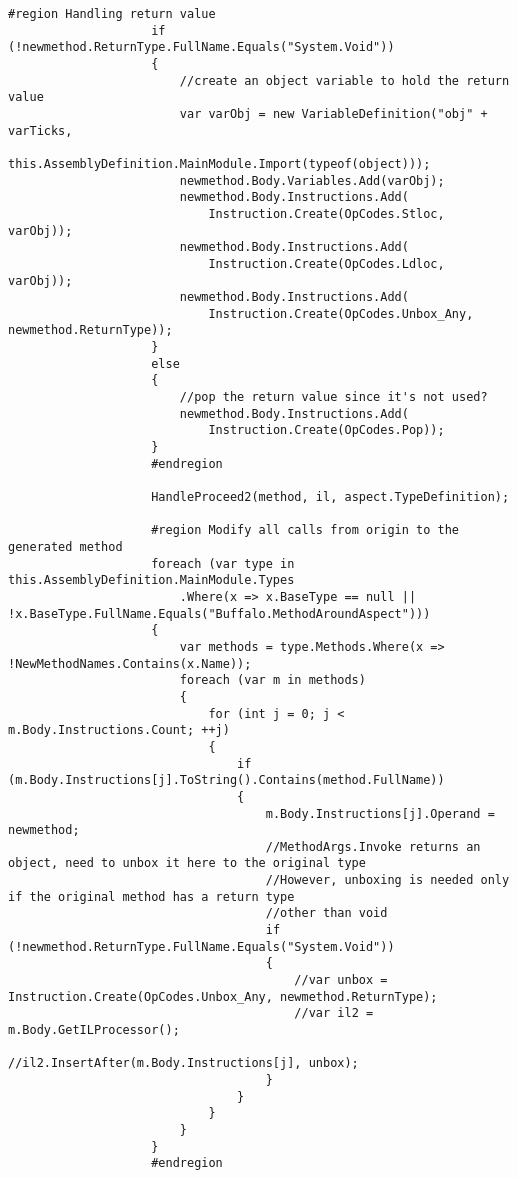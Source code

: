 \begin{lstlisting}[caption={../buffalo/Injectors/MethodAroundInjector.cs}, label=../buffalo/Injectors/MethodAroundInjector.cs, frame=tb, basicstyle=\scriptsize]
                    #region Handling return value
                    if (!newmethod.ReturnType.FullName.Equals("System.Void"))
                    {
                        //create an object variable to hold the return value
                        var varObj = new VariableDefinition("obj" + varTicks,
                            this.AssemblyDefinition.MainModule.Import(typeof(object)));
                        newmethod.Body.Variables.Add(varObj);
                        newmethod.Body.Instructions.Add(
                            Instruction.Create(OpCodes.Stloc, varObj));
                        newmethod.Body.Instructions.Add(
                            Instruction.Create(OpCodes.Ldloc, varObj));
                        newmethod.Body.Instructions.Add(
                            Instruction.Create(OpCodes.Unbox_Any, newmethod.ReturnType));
                    }
                    else
                    {
                        //pop the return value since it's not used?
                        newmethod.Body.Instructions.Add(
                            Instruction.Create(OpCodes.Pop));
                    }
                    #endregion

                    HandleProceed2(method, il, aspect.TypeDefinition);

                    #region Modify all calls from origin to the generated method
                    foreach (var type in this.AssemblyDefinition.MainModule.Types
                        .Where(x => x.BaseType == null || !x.BaseType.FullName.Equals("Buffalo.MethodAroundAspect")))
                    {
                        var methods = type.Methods.Where(x => !NewMethodNames.Contains(x.Name));
                        foreach (var m in methods)
                        {
                            for (int j = 0; j < m.Body.Instructions.Count; ++j)
                            {
                                if (m.Body.Instructions[j].ToString().Contains(method.FullName))
                                {
                                    m.Body.Instructions[j].Operand = newmethod;
                                    //MethodArgs.Invoke returns an object, need to unbox it here to the original type
                                    //However, unboxing is needed only if the original method has a return type
                                    //other than void
                                    if (!newmethod.ReturnType.FullName.Equals("System.Void"))
                                    {
                                        //var unbox = Instruction.Create(OpCodes.Unbox_Any, newmethod.ReturnType);
                                        //var il2 = m.Body.GetILProcessor();
                                        //il2.InsertAfter(m.Body.Instructions[j], unbox);
                                    }
                                }
                            }
                        }
                    }
                    #endregion


\end{lstlisting}
